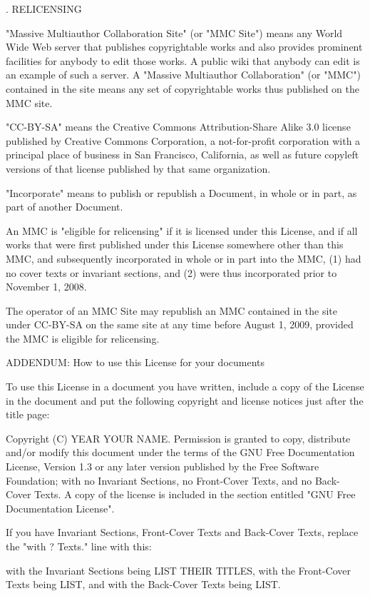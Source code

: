 . RELICENSING

"Massive Multiauthor Collaboration Site" (or "MMC Site") means any World Wide Web server that publishes copyrightable works and also provides prominent facilities for anybody to edit those works. A public wiki that anybody can edit is an example of such a server. A "Massive Multiauthor Collaboration" (or "MMC") contained in the site means any set of copyrightable works thus published on the MMC site.

"CC-BY-SA" means the Creative Commons Attribution-Share Alike 3.0 license published by Creative Commons Corporation, a not-for-profit corporation with a principal place of business in San Francisco, California, as well as future copyleft versions of that license published by that same organization.

"Incorporate" means to publish or republish a Document, in whole or in part, as part of another Document.

An MMC is "eligible for relicensing" if it is licensed under this License, and if all works that were first published under this License somewhere other than this MMC, and subsequently incorporated in whole or in part into the MMC, (1) had no cover texts or invariant sections, and (2) were thus incorporated prior to November 1, 2008.

The operator of an MMC Site may republish an MMC contained in the site under CC-BY-SA on the same site at any time before August 1, 2009, provided the MMC is eligible for relicensing.

\vparasmall
ADDENDUM: How to use this License for your documents

To use this License in a document you have written, include a copy of the License in the document and put the following copyright and license notices just after the title page:

Copyright (C)  YEAR  YOUR NAME.
Permission is granted to copy, distribute and/or modify this document
under the terms of the GNU Free Documentation License, Version 1.3
or any later version published by the Free Software Foundation;
with no Invariant Sections, no Front-Cover Texts, and no Back-Cover Texts.
A copy of the license is included in the section entitled "GNU
Free Documentation License".

If you have Invariant Sections, Front-Cover Texts and Back-Cover Texts, replace the "with ? Texts." line with this:

with the Invariant Sections being LIST THEIR TITLES, with the
Front-Cover Texts being LIST, and with the Back-Cover Texts being LIST.

